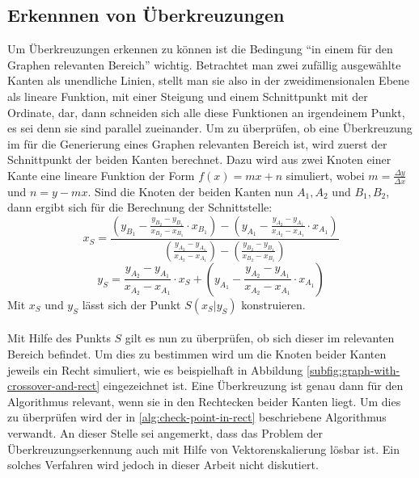 \subsection{Erkennnen von Überkreuzungen}
Um Überkreuzungen erkennen zu können ist die Bedingung \enquote{in einem für den Graphen relevanten Bereich} wichtig.
Betrachtet man zwei zufällig ausgewählte Kanten als unendliche Linien, stellt man sie also in der zweidimensionalen Ebene als lineare Funktion, mit einer Steigung und einem Schnittpunkt mit der Ordinate, dar, dann schneiden sich alle diese Funktionen an irgendeinem Punkt, es sei denn sie sind parallel zueinander.
Um zu überprüfen, ob eine Überkreuzung im für die Generierung eines Graphen relevanten Bereich ist, wird zuerst der Schnittpunkt der beiden Kanten berechnet.
Dazu wird aus zwei Knoten einer Kante eine lineare Funktion der Form $f(x) =mx+n$ simuliert, wobei $m=\frac{\Delta y}{\Delta x}$ und $n=y - mx$.
Sind die Knoten der beiden Kanten nun $A_1,A_2$ und $B_1,B_2$, dann ergibt sich für die Berechnung der Schnittstelle:
\begin{equation}
    \label{eq:calculation-xs}
    x_S = \frac{(y_{B_1} - \frac{y_{B_2} - y_{B_1}}{x_{B_2} - x_{B_1}}\cdot x_{B_1}) - (y_{A_1} - \frac{y_{A_2} - y_{A_1}}{x_{A_2} - x_{A_1}}\cdot x_{A_1})}{(\frac{y_{A_2} - y_{A_1}}{x_{A_2} - x_{A_1}}) - (\frac{y_{B_2} - y_{B_1}}{x_{B_2} - x_{B_1}})} 
\end{equation}
\begin{equation}
    \label{eq:calculation-ys}
    y_S = \frac{y_{A_2} - y_{A_1}}{x_{A_2} - x_{A_1}}\cdot x_S + (y_{A_1} - \frac{y_{A_2} - y_{A_1}}{x_{A_2} - x_{A_1}}\cdot x_{A_1})
\end{equation}
Mit $x_S$ und $y_S$ lässt sich der Punkt $S(x_S|y_S)$ konstruieren.
\\\\
Mit Hilfe des Punkts $S$ gilt es nun zu überprüfen, ob sich dieser im relevanten Bereich befindet.
Um dies zu bestimmen wird um die Knoten beider Kanten jeweils ein Recht simuliert, wie es beispielhaft in Abbildung \vref{subfig:graph-with-crossover-and-rect} eingezeichnet ist.
Eine Überkreuzung ist genau dann für den Algorithmus relevant, wenn sie in den Rechtecken beider Kanten liegt.
Um dies zu überprüfen wird der in \vref{alg:check-point-in-rect} beschriebene Algorithmus verwandt.
An dieser Stelle sei angemerkt, dass das Problem der Überkreuzungserkennung auch mit Hilfe von Vektorenskalierung lösbar ist.
Ein solches Verfahren wird jedoch in dieser Arbeit nicht diskutiert.


